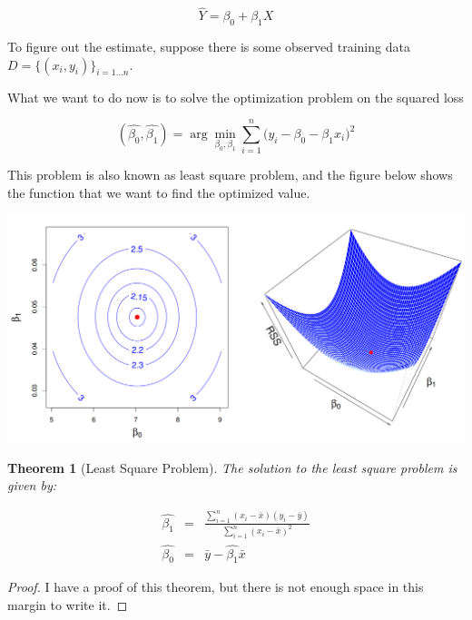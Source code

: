 \documentclass{article}
\theoremstyle{MyNonumberplain}
\theoremstyle{break}
\newtheorem*{proof}{Proof. }
\newcommand{\bt}[1]{\beta_{#1}}
\newcommand\ddfrac[2]{\frac{\displaystyle #1}{\displaystyle #2}}
\theoremstyle{break}
\newtheorem{theorem}{Theorem}[section]
\theoremstyle{break}
\theoremstyle{break}
\begin{document}
$$\hat{Y}=\bt{0}+\bt{1}X$$

To figure out the estimate, suppose there is some observed training data $D=\biggl\{(x_i,y_i)\biggr\}_{i=1...n}$.

What we want to do now is to solve the optimization problem on the squared loss

$$(\hat{\bt{0}},\hat{\bt{1}})=\arg\min_{\bt{0},\bt{1}}\sum_{i=1}^n\bigl(y_i-\bt{0}-\bt{1}x_i\bigr)^2$$

This problem is also known as least square problem, and the figure below shows the function that we want to find the optimized value.

\begin{center}
    \includegraphics*[scale=0.25]{img7.png}
\end{center}

\begin{thmbox}
    \begin{theorem}[Least Square Problem]
        The solution to the least square problem is given by: 
    \end{theorem}
        \begin{eqnarray*}
            \hat{\bt{1}}&=& \ddfrac{\sum_{i=1}^n(x_i-\bar{x})(y_i-\bar{y})}{\sum_{i=1}^n(x_i-\bar{x})^2}\\
            \hat{\bt{0}}&=& \bar{y}- \hat{\bt{1}}\bar{x}
        \end{eqnarray*}
        \begin{prfbox}
            \begin{proof}
                I have a proof of this theorem, but there is not enough space in this margin to write it. 
            \end{proof}
        \end{prfbox}
\end{thmbox}
\end{document}
